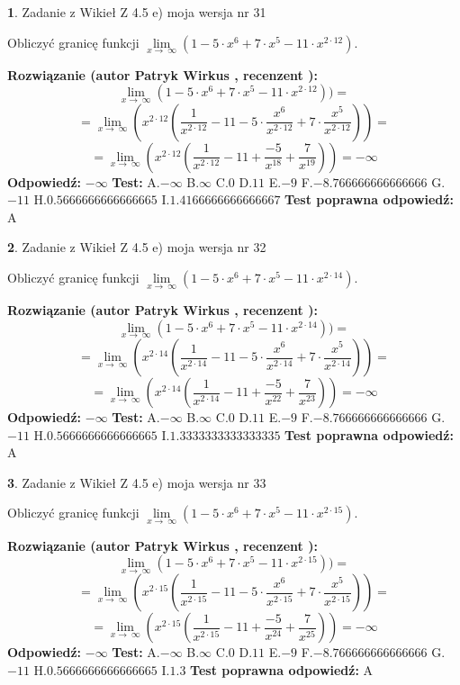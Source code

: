 \documentclass[12pt, a4paper]{article}
\theoremstyle{definition} %
\newtheorem{zad}{}
\newcommand{\zadStart}[1]{\begin{zad}#1\newline}
\newcommand{\zadStop}{\end{zad}}
\newcommand{\rozwStart}[2]{\noindent \textbf{Rozwiązanie (autor #1 , recenzent #2): }\newline}
\newcommand{\rozwStop}{\newline}
\newcommand{\odpStart}{\noindent \textbf{Odpowiedź:}\newline}
\newcommand{\odpStop}{\newline}
\newcommand{\testStart}{\noindent \textbf{Test:}\newline}
\newcommand{\testStop}{\newline}
\newcommand{\kluczStart}{\noindent \textbf{Test poprawna odpowiedź:}\newline}
\newcommand{\kluczStop}{\newline}
\begin{document}
\zadStart{Zadanie z Wikieł Z 4.5 e) moja wersja nr 31}


Obliczyć granicę funkcji  $\lim\limits_{x\to\ \infty}(1 - 5 \cdot x^{6}+7 \cdot x^{5}- 11 \cdot x^{2\cdot12})$.
\zadStop
\rozwStart{Patryk Wirkus}{}
$$\lim\limits_{x\to\ \infty}(1 - 5 \cdot x^{6}+7 \cdot x^{5}- 11 \cdot x^{2\cdot12}))=$$
$$=\lim\limits_{x\to\ \infty}(x^{2\cdot12}(\frac{1}{x^{2\cdot12}}-11 -5 \cdot \frac{x^{6}}{x^{2\cdot12}}+7 \cdot \frac{x^{5}}{x^{2\cdot12}}))=$$
$$=\lim\limits_{x\to\ \infty}(x^{2\cdot12}(\frac{1}{x^{2\cdot12}}-11 + \frac{-5}{x^{18}}+ \frac{7}{x^{19}}))=-\infty$$
\rozwStop
\odpStart
$-\infty$
\odpStop
\testStart
A.$-\infty$ B.$\infty$ C.$0$ D.$11$ E.$-9$
F.$-8.766666666666666$ G.$-11$
H.$0.5666666666666665$
I.$1.4166666666666667$
\testStop
\kluczStart
A
\kluczStop



\zadStart{Zadanie z Wikieł Z 4.5 e) moja wersja nr 32}


Obliczyć granicę funkcji  $\lim\limits_{x\to\ \infty}(1 - 5 \cdot x^{6}+7 \cdot x^{5}- 11 \cdot x^{2\cdot14})$.
\zadStop
\rozwStart{Patryk Wirkus}{}
$$\lim\limits_{x\to\ \infty}(1 - 5 \cdot x^{6}+7 \cdot x^{5}- 11 \cdot x^{2\cdot14}))=$$
$$=\lim\limits_{x\to\ \infty}(x^{2\cdot14}(\frac{1}{x^{2\cdot14}}-11 -5 \cdot \frac{x^{6}}{x^{2\cdot14}}+7 \cdot \frac{x^{5}}{x^{2\cdot14}}))=$$
$$=\lim\limits_{x\to\ \infty}(x^{2\cdot14}(\frac{1}{x^{2\cdot14}}-11 + \frac{-5}{x^{22}}+ \frac{7}{x^{23}}))=-\infty$$
\rozwStop
\odpStart
$-\infty$
\odpStop
\testStart
A.$-\infty$ B.$\infty$ C.$0$ D.$11$ E.$-9$
F.$-8.766666666666666$ G.$-11$
H.$0.5666666666666665$
I.$1.3333333333333335$
\testStop
\kluczStart
A
\kluczStop



\zadStart{Zadanie z Wikieł Z 4.5 e) moja wersja nr 33}


Obliczyć granicę funkcji  $\lim\limits_{x\to\ \infty}(1 - 5 \cdot x^{6}+7 \cdot x^{5}- 11 \cdot x^{2\cdot15})$.
\zadStop
\rozwStart{Patryk Wirkus}{}
$$\lim\limits_{x\to\ \infty}(1 - 5 \cdot x^{6}+7 \cdot x^{5}- 11 \cdot x^{2\cdot15}))=$$
$$=\lim\limits_{x\to\ \infty}(x^{2\cdot15}(\frac{1}{x^{2\cdot15}}-11 -5 \cdot \frac{x^{6}}{x^{2\cdot15}}+7 \cdot \frac{x^{5}}{x^{2\cdot15}}))=$$
$$=\lim\limits_{x\to\ \infty}(x^{2\cdot15}(\frac{1}{x^{2\cdot15}}-11 + \frac{-5}{x^{24}}+ \frac{7}{x^{25}}))=-\infty$$
\rozwStop
\odpStart
$-\infty$
\odpStop
\testStart
A.$-\infty$ B.$\infty$ C.$0$ D.$11$ E.$-9$
F.$-8.766666666666666$ G.$-11$
H.$0.5666666666666665$
I.$1.3$
\testStop
\kluczStart
A
\kluczStop
\end{document}
